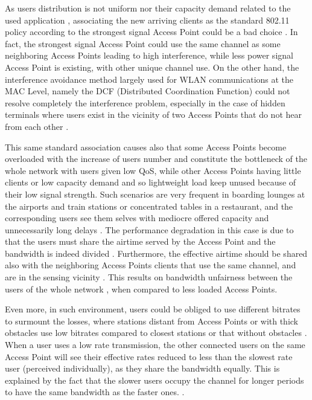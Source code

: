 \documentclass[journal,transmag]{IEEEtran}
\begin{document}
As users distribution is not uniform \cite{14AP_association_multirate_WLAN} nor their capacity demand related to the used application \cite{17QOS_AP_selection}, associating the new arriving clients as the standard 802.11 policy according to the strongest signal Access Point could be a bad choice \cite{14optimalAP_INFOCOM}. In fact, the strongest signal Access Point could use the same channel as some neighboring Access Points leading to high interference, while less power signal Access Point is existing, with other unique channel use. On the other hand, the interference avoidance method largely used for WLAN communications at the MAC Level, namely the DCF (Distributed Coordination Function) could not resolve completely the interference problem, especially in the case of hidden terminals where users exist in the vicinity of two Access Points that do not hear from each other \cite{04Intelligent_resource_management}.

This same standard association causes also that some Access Points become overloaded with the increase of users number and constitute the bottleneck of the whole network \cite{14AP_association_multirate_WLAN} with users given low QoS, while other Access Points having little clients or low capacity demand and so lightweight load keep unused because of their low signal strength. Such scenarios are very frequent in boarding lounges at the airports and train stations or concentrated tables in a restaurant, and the corresponding users see them selves with mediocre offered capacity and unnecessarily long delays \cite{15Node_throughput_enhencement_wifi,15OpenSDWN_home_entreprise_WIFI,14online_AP_association_80211n,10Assesment_EDCA_real_time,16Indoor_spatial_reuse_adaptive_antenna}. 
The performance degradation in this case is due to that the users must share the airtime served by the Access Point and the bandwidth is indeed divided \cite{04Intelligent_resource_management}. Furthermore, the effective airtime should be shared also with the neighboring Access Points clients that use the same channel, and are in the sensing vicinity \cite{11user_centric_management_WLAN}. This results on bandwidth unfairness between the users of the whole network \cite{16AP_association_optimisation_fairness}, when compared to less loaded Access Points.

Even more, in such environment, users could be obliged to use different bitrates to surmount the losses, where stations distant from Access Points or with thick obstacles use low bitrates compared to closest stations or that without obstacles \cite{15time_fairness_MAC}. When a user uses a low rate transmission, the other connected users on the same Access Point will see their effective rates reduced to less than the slowest rate user (perceived individually), as they share the bandwidth equally. This is explained by the fact that the slower users occupy the channel for longer periods to have the same bandwidth as the faster ones. \cite{16AP_association_optimisation_fairness}.
\end{document}
